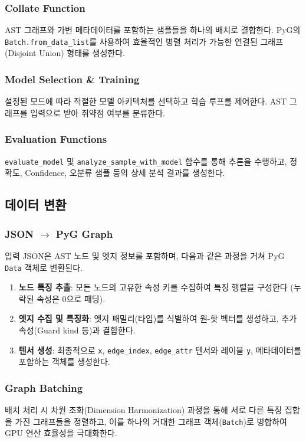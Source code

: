 \subsubsection{Collate Function}
AST 그래프와 가변 메타데이터를 포함하는 샘플들을 하나의 배치로 결합한다. PyG의 \texttt{Batch.from\_data\_list}를 사용하여 효율적인 병렬 처리가 가능한 연결된 그래프(Disjoint Union) 형태를 생성한다.

\subsubsection{Model Selection \& Training}
설정된 모드에 따라 적절한 모델 아키텍처를 선택하고 학습 루프를 제어한다. AST 그래프를 입력으로 받아 취약점 여부를 분류한다.

\subsubsection{Evaluation Functions}
\texttt{evaluate\_model} 및 \texttt{analyze\_sample\_with\_model} 함수를 통해 추론을 수행하고, 정확도, Confidence, 오분류 샘플 등의 상세 분석 결과를 생성한다.

\subsection{데이터 변환}

\subsubsection{JSON $\rightarrow$ PyG Graph}
입력 JSON은 AST 노드 및 엣지 정보를 포함하며, 다음과 같은 과정을 거쳐 PyG \texttt{Data} 객체로 변환된다.

\begin{enumerate}
    \item \textbf{노드 특징 추출}: 모든 노드의 고유한 속성 키를 수집하여 특징 행렬을 구성한다 (누락된 속성은 0으로 패딩).
    \item \textbf{엣지 수집 및 특징화}: 엣지 패밀리(타입)를 식별하여 원-핫 벡터를 생성하고, 추가 속성(Guard kind 등)과 결합한다.
    \item \textbf{텐서 생성}: 최종적으로 \texttt{x}, \texttt{edge\_index}, \texttt{edge\_attr} 텐서와 레이블 \texttt{y}, 메타데이터를 포함하는 객체를 생성한다.
\end{enumerate}

\subsubsection{Graph Batching}
배치 처리 시 차원 조화(Dimension Harmonization) 과정을 통해 서로 다른 특징 집합을 가진 그래프들을 정렬하고, 이를 하나의 거대한 그래프 객체(\texttt{Batch})로 병합하여 GPU 연산 효율성을 극대화한다.

